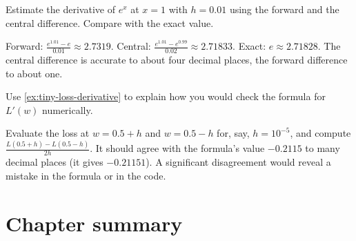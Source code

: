 \begin{exercise}
Estimate the derivative of $e^x$ at $x = 1$ with $h = 0.01$ using the forward
and the central difference. Compare with the exact value.
\end{exercise}
\begin{solution}
Forward: $\tfrac{e^{1.01} - e}{0.01} \approx 2.7319$. Central:
$\tfrac{e^{1.01} - e^{0.99}}{0.02} \approx 2.71833$. Exact: $e \approx 2.71828$.
The central difference is accurate to about four decimal places, the forward
difference to about one.
\end{solution}

\begin{exercise}
Use \cref{ex:tiny-loss-derivative} to explain how you would check the formula
for $L'(w)$ numerically.
\end{exercise}
\begin{solution}
Evaluate the loss at $w = 0.5 + h$ and $w = 0.5 - h$ for, say, $h = 10^{-5}$,
and compute $\tfrac{L(0.5 + h) - L(0.5 - h)}{2h}$. It should agree with the
formula's value $-0.2115$ to many decimal places (it gives $-0.21151$). A
significant disagreement would reveal a mistake in the formula or in the code.
\end{solution}

\section{Chapter summary}\label{sec:ch6-summary}

